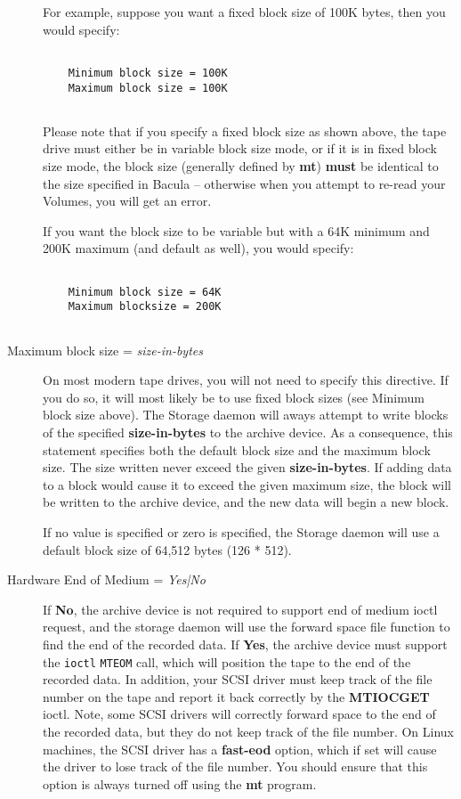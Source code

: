 \begin{description}
For  example, suppose you want a fixed block size of 100K bytes, then you 
would specify:  

\footnotesize
\begin{verbatim}
 
    Minimum block size = 100K
    Maximum block size = 100K
    
\end{verbatim}
\normalsize

Please note that if you specify a fixed block size as shown above,  the tape
drive must either be in variable block size mode, or  if it is in fixed block
size mode, the block size (generally  defined by {\bf mt}) {\bf must} be
identical to the size specified  in Bacula -- otherwise when you attempt to
re-read your Volumes,  you will get an error.  

If you want the  block size to be variable but with a 64K minimum and 200K
maximum (and  default as well), you would specify:  

\footnotesize
\begin{verbatim}
 
    Minimum block size = 64K
    Maximum blocksize = 200K
   
\end{verbatim}
\normalsize

\item [Maximum block size = {\it size-in-bytes}]
   On most modern tape drives, you will not need to specify  this directive. If
you do so, it will most likely be to  use fixed block sizes (see Minimum block
size above).  The Storage daemon will aways attempt to write blocks of the 
specified {\bf size-in-bytes} to the archive device. As a  consequence, this
statement specifies both the default block size  and the maximum block size.
The size written never exceed the given  {\bf size-in-bytes}. If adding data
to a block would cause it to  exceed the given maximum size, the block will be
written to the  archive device, and the new data will begin a new block. 

If no  value is specified or zero is specified, the Storage daemon will use  a
default block size of 64,512 bytes (126 * 512). 

\item [Hardware End of Medium = {\it Yes|No}]
   If {\bf No}, the archive device is not required to support end  of medium
ioctl request, and the storage daemon will use the forward  space file
function to find the end of the recorded data. If  {\bf Yes}, the archive
device must support the {\tt ioctl}  {\tt MTEOM} call, which will position the
tape to the end of the  recorded data. In addition, your SCSI driver must keep
track  of the file number on the tape and report it back correctly by  the
{\bf MTIOCGET} ioctl. Note, some SCSI drivers will correctly  forward space to
the end of the recorded data, but they do not  keep track of the file number.
On Linux machines, the SCSI driver  has a {\bf fast-eod} option, which if set
will cause the driver  to lose track of the file number. You should ensure
that this  option is always turned off using the {\bf mt} program.  


\end{description}
